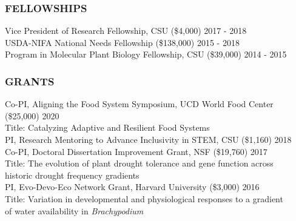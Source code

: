 \documentclass[12pt,english]{article}
\begin{document}
\subsubsection*{FELLOWSHIPS}
\vspace{-0.5ex}
\hspace*{1.0em} Vice President of Research Fellowship, CSU (\$4,000)
\hfill
2017 - 2018
\vspace{1ex}\\
\hspace*{1.0em} USDA-NIFA National Needs Fellowship (\$138,000)
\hfill
2015 - 2018
\vspace{1ex}\\
\hspace*{1.0em} Program in Molecular Plant Biology Fellowship, CSU (\$39,000)
\hfill
2014 - 2015
\vspace{1ex}



\subsubsection*{GRANTS}
\vspace{-0.5ex}
\hspace*{1.0em}Co-PI, Aligning the Food System Symposium, UCD World Food Center (\$25,000)
\hfill
2020\\
\hspace*{2.0em} Title: Catalyzing Adaptive and Resilient Food Systems
\vspace{1ex}\\
\hspace*{1.0em} PI, Research Mentoring to Advance Inclusivity in STEM, CSU (\$1,160)
\hfill
2018\vspace{1ex}\\
\hspace*{1.0em} Co-PI, Doctoral Dissertation Improvement Grant, NSF (\$19,760)
\hfill
2017\\
\hspace*{2.0em} Title: The evolution of plant drought tolerance and gene function across\\
\hspace*{2.0em} historic drought frequency gradients
\vspace{1ex}\\
\hspace*{1.0em} PI, Evo-Devo-Eco Network Grant, Harvard University (\$3,000)
\hfill
2016\\
\hspace*{2.0em} Title: Variation  in  developmental  and  physiological  responses  to  a  gradient\\ \hspace*{2.0em} of water availability in \textit{Brachypodium}
\vspace{1ex}
\end{document}
